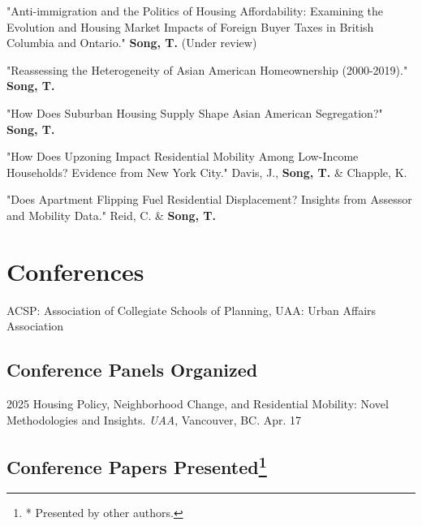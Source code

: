 \documentclass[12pt,letterpaper]{report}
\newcommand{\listitemspace}{0.4em}
\renewenvironment{itemize}
{\begin{list}{}{\setlength{\leftmargin}{0.5em}
                \setlength{\parskip}{0em}
                \setlength{\itemsep}{\listitemspace}
                \setlength{\parsep}{\listitemspace}}}
{\end{list}}
\begin{document}
\begin{itemize}
  \setlength{\itemsep}{-0.0em}  %
  \item "Anti-immigration and the Politics of Housing Affordability: Examining the Evolution and Housing Market Impacts of Foreign Buyer Taxes in British Columbia and Ontario." \textbf{Song, T.} (Under review)
  \item "Reassessing the Heterogeneity of Asian American Homeownership (2000-2019)." \textbf{Song, T.}
  \item "How Does Suburban Housing Supply Shape Asian American Segregation?" \textbf{Song, T.}
  \item "How Does Upzoning Impact Residential Mobility Among Low-Income Households? Evidence from New York City." Davis, J., \textbf{Song, T.} \& Chapple, K.
  \item "Does Apartment Flipping Fuel Residential Displacement? Insights from Assessor and Mobility Data." Reid, C. \& \textbf{Song, T.}
    \end{itemize}


\section*{Conferences}
ACSP: Association of Collegiate Schools of Planning, UAA: Urban Affairs Association

\subsection*{Conference Panels Organized}

\begin{tablist}
  \item[2025] \tab{}Housing Policy, Neighborhood Change, and Residential Mobility: Novel Methodologies and Insights. \emph{UAA}, Vancouver, BC. Apr. 17
\end{tablist}

\subsection*{Conference Papers Presented\footnote{ * Presented by other authors.}}
\end{document}
